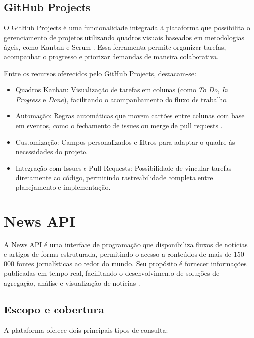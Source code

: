 \subsection{GitHub Projects}
\label{subsec:github-projects}

O GitHub Projects é uma funcionalidade integrada à plataforma que possibilita o gerenciamento de projetos utilizando quadros visuais baseados em metodologias ágeis, como Kanban e Scrum \cite{github_projects}. Essa ferramenta permite organizar tarefas, acompanhar o progresso e priorizar demandas de maneira colaborativa.

Entre os recursos oferecidos pelo GitHub Projects, destacam-se:

\begin{itemize}
\item Quadros Kanban: Visualização de tarefas em colunas (como \textit{To Do}, \textit{In Progress} e \textit{Done}), facilitando o acompanhamento do fluxo de trabalho.
\item Automação: Regras automáticas que movem cartões entre colunas com base em eventos, como o fechamento de issues ou merge de pull requests \cite{github_projects}.
\item Customização: Campos personalizados e filtros para adaptar o quadro às necessidades do projeto.
\item Integração com Issues e Pull Requests: Possibilidade de vincular tarefas diretamente ao código, permitindo rastreabilidade completa entre planejamento e implementação.
\end{itemize}






\section{News API}
\label{sec:news-api}

A News API é uma interface de programação que disponibiliza fluxos de notícias e artigos de forma estruturada, permitindo o acesso a conteúdos de mais de 150\,000 fontes jornalísticas ao redor do mundo. Seu propósito é fornecer informações publicadas em tempo real, facilitando o desenvolvimento de soluções de agregação, análise e visualização de notícias \cite{newsapi_docs}.

\subsection{Escopo e cobertura}
A plataforma oferece dois principais tipos de consulta: 

